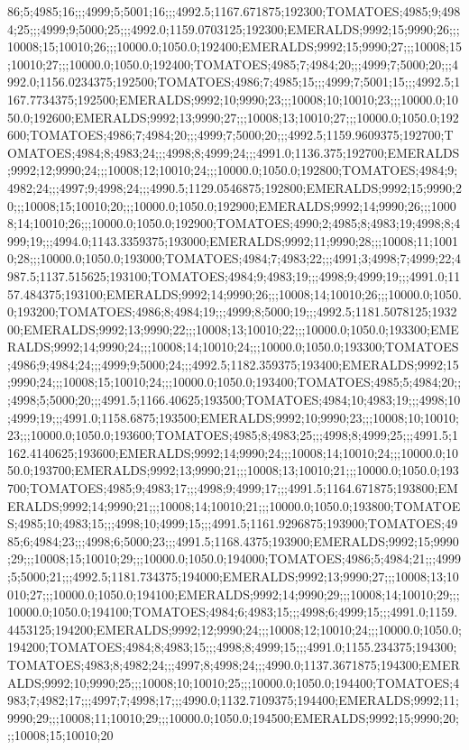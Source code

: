 86;5;4985;16;;;4999;5;5001;16;;;4992.5;1167.671875;192300;TOMATOES;4985;9;4984;25;;;4999;9;5000;25;;;4992.0;1159.0703125;192300;EMERALDS;9992;15;9990;26;;;10008;15;10010;26;;;10000.0;1050.0;192400;EMERALDS;9992;15;9990;27;;;10008;15;10010;27;;;10000.0;1050.0;192400;TOMATOES;4985;7;4984;20;;;4999;7;5000;20;;;4992.0;1156.0234375;192500;TOMATOES;4986;7;4985;15;;;4999;7;5001;15;;;4992.5;1167.7734375;192500;EMERALDS;9992;10;9990;23;;;10008;10;10010;23;;;10000.0;1050.0;192600;EMERALDS;9992;13;9990;27;;;10008;13;10010;27;;;10000.0;1050.0;192600;TOMATOES;4986;7;4984;20;;;4999;7;5000;20;;;4992.5;1159.9609375;192700;TOMATOES;4984;8;4983;24;;;4998;8;4999;24;;;4991.0;1136.375;192700;EMERALDS;9992;12;9990;24;;;10008;12;10010;24;;;10000.0;1050.0;192800;TOMATOES;4984;9;4982;24;;;4997;9;4998;24;;;4990.5;1129.0546875;192800;EMERALDS;9992;15;9990;20;;;10008;15;10010;20;;;10000.0;1050.0;192900;EMERALDS;9992;14;9990;26;;;10008;14;10010;26;;;10000.0;1050.0;192900;TOMATOES;4990;2;4985;8;4983;19;4998;8;4999;19;;;4994.0;1143.3359375;193000;EMERALDS;9992;11;9990;28;;;10008;11;10010;28;;;10000.0;1050.0;193000;TOMATOES;4984;7;4983;22;;;4991;3;4998;7;4999;22;4987.5;1137.515625;193100;TOMATOES;4984;9;4983;19;;;4998;9;4999;19;;;4991.0;1157.484375;193100;EMERALDS;9992;14;9990;26;;;10008;14;10010;26;;;10000.0;1050.0;193200;TOMATOES;4986;8;4984;19;;;4999;8;5000;19;;;4992.5;1181.5078125;193200;EMERALDS;9992;13;9990;22;;;10008;13;10010;22;;;10000.0;1050.0;193300;EMERALDS;9992;14;9990;24;;;10008;14;10010;24;;;10000.0;1050.0;193300;TOMATOES;4986;9;4984;24;;;4999;9;5000;24;;;4992.5;1182.359375;193400;EMERALDS;9992;15;9990;24;;;10008;15;10010;24;;;10000.0;1050.0;193400;TOMATOES;4985;5;4984;20;;;4998;5;5000;20;;;4991.5;1166.40625;193500;TOMATOES;4984;10;4983;19;;;4998;10;4999;19;;;4991.0;1158.6875;193500;EMERALDS;9992;10;9990;23;;;10008;10;10010;23;;;10000.0;1050.0;193600;TOMATOES;4985;8;4983;25;;;4998;8;4999;25;;;4991.5;1162.4140625;193600;EMERALDS;9992;14;9990;24;;;10008;14;10010;24;;;10000.0;1050.0;193700;EMERALDS;9992;13;9990;21;;;10008;13;10010;21;;;10000.0;1050.0;193700;TOMATOES;4985;9;4983;17;;;4998;9;4999;17;;;4991.5;1164.671875;193800;EMERALDS;9992;14;9990;21;;;10008;14;10010;21;;;10000.0;1050.0;193800;TOMATOES;4985;10;4983;15;;;4998;10;4999;15;;;4991.5;1161.9296875;193900;TOMATOES;4985;6;4984;23;;;4998;6;5000;23;;;4991.5;1168.4375;193900;EMERALDS;9992;15;9990;29;;;10008;15;10010;29;;;10000.0;1050.0;194000;TOMATOES;4986;5;4984;21;;;4999;5;5000;21;;;4992.5;1181.734375;194000;EMERALDS;9992;13;9990;27;;;10008;13;10010;27;;;10000.0;1050.0;194100;EMERALDS;9992;14;9990;29;;;10008;14;10010;29;;;10000.0;1050.0;194100;TOMATOES;4984;6;4983;15;;;4998;6;4999;15;;;4991.0;1159.4453125;194200;EMERALDS;9992;12;9990;24;;;10008;12;10010;24;;;10000.0;1050.0;194200;TOMATOES;4984;8;4983;15;;;4998;8;4999;15;;;4991.0;1155.234375;194300;TOMATOES;4983;8;4982;24;;;4997;8;4998;24;;;4990.0;1137.3671875;194300;EMERALDS;9992;10;9990;25;;;10008;10;10010;25;;;10000.0;1050.0;194400;TOMATOES;4983;7;4982;17;;;4997;7;4998;17;;;4990.0;1132.7109375;194400;EMERALDS;9992;11;9990;29;;;10008;11;10010;29;;;10000.0;1050.0;194500;EMERALDS;9992;15;9990;20;;;10008;15;10010;20